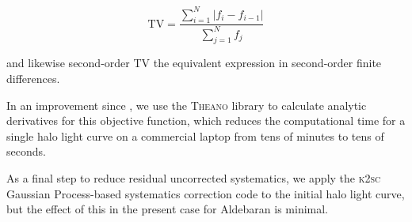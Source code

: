 \documentclass[modern]{aastex61}
\begin{document}
\begin{equation}
\text{TV} = \dfrac{\sum_{i=1}^{N} |{f}_i - {f}_{i-1}|}{\sum_{j=1}^{N} {f}_j}
\end{equation}

\noindent and likewise second-order TV the equivalent expression in second-order finite differences. 

In an improvement since \citet{White2017}, we use the \textsc{Theano} library \citep{theano} to calculate analytic derivatives for this objective function, which reduces the computational time for a single halo light curve on a commercial laptop from tens of minutes to tens of seconds. 

As a final step to reduce residual uncorrected systematics, we apply the \textsc{k2sc} \citep{k2sc} Gaussian Process-based systematics correction code to the initial halo light curve, but the effect of this in the present case for Aldebaran is minimal.


\end{document}
